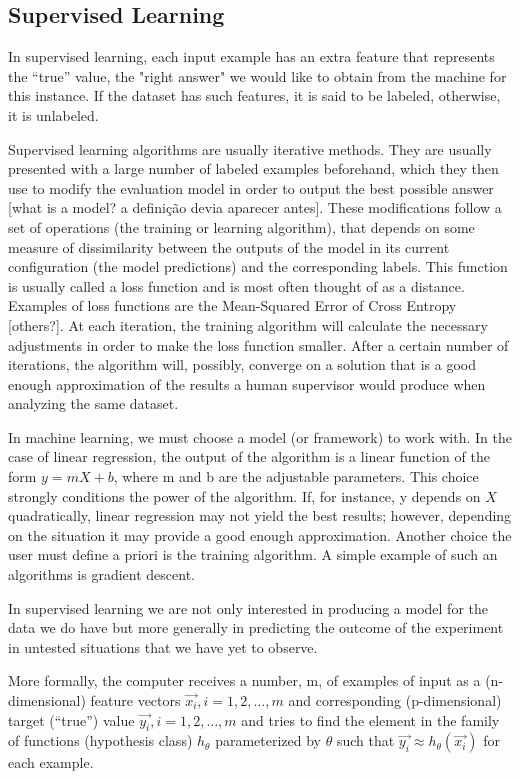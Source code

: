 \documentclass{article}
\begin{document}
\subsection{Supervised Learning}
\label{subsec:supervised-learning}

In supervised learning, each input example has an extra feature that represents the “true” value, the "right answer" we would like to obtain from the machine for this instance. If the dataset has such features, it is said to be labeled, otherwise, it is unlabeled.

Supervised learning algorithms are usually iterative methods. They are usually presented with a large number of labeled examples beforehand, which they then use to modify the evaluation model in order to output the best possible answer [what is a model? a definição devia aparecer antes]. These modifications follow a set of operations (the training or learning algorithm), that depends on some measure of dissimilarity between the outputs of the model in its current configuration (the model predictions) and the corresponding labels. This function is usually called a loss function and is most often thought of as a distance. Examples of loss functions are the Mean-Squared Error of Cross Entropy [others?]. At each iteration, the training algorithm will calculate the necessary adjustments in order to make the loss function smaller. After a certain number of iterations, the algorithm will, possibly, converge on a solution that is a good enough approximation of the results a human supervisor would produce when analyzing the same dataset.

In machine learning, we must choose a model (or framework) to work with. In the case of linear regression, the output of the algorithm is a linear function of the form $y = mX + b$, where m and b are the adjustable parameters. This choice strongly conditions the power of the algorithm. If, for instance, y depends on $X$ quadratically, linear regression may not yield the best results; however, depending on the situation it may provide a good enough approximation.
Another choice the user must define a priori is the training algorithm. A simple example of such an algorithms is gradient descent. 

In supervised learning we are not only interested in producing a model for the data we do have but more generally in predicting the outcome of the experiment in untested situations that we have yet to observe.

More formally, the computer receives a number, m, of examples of input as a (n-dimensional) feature vectors $\vec{x_i}, i = 1,2, \ldots ,m$ and corresponding (p-dimensional) target (“true”) value $\vec{ y_i}, i=1,2, \ldots ,m$ and tries to find the element in the family of functions (hypothesis class) $h_{\theta}$ parameterized by $\theta$ such that $\vec{ y_i}  \approx h_\theta \left(\vec {x_i} \right)$ for each example. 
\end{document}
